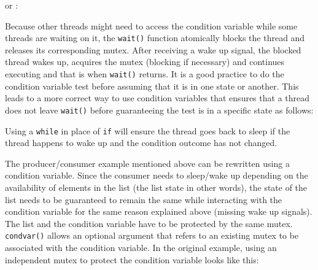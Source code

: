 
or :


Because other threads might need to access the condition variable while
some threads are waiting on it, the \texttt{wait()} function
atomically blocks the thread and releases its corresponding mutex.
After receiving a wake up signal, the blocked thread wakes up, acquires
the mutex (blocking if necessary) and continues executing and that is
when \texttt{wait()} returns. It is a good practice to do
the condition variable test before assuming that it is in one state or
another. This leads to a more correct way to use condition variables
that ensures that a thread does not leave \texttt{wait()}
before guaranteeing the test is in a specific state as follows:


Using a \texttt{while} in place of \texttt{if}
will ensure the thread goes back to sleep if the thread happens to wake
up and the condition outcome has not changed.

The producer/consumer example mentioned above can be rewritten using a
condition variable. Since the consumer needs to sleep/wake up depending
on the availability of elements in the list (the list state in other
words), the state of the list needs to be guaranteed to remain the same
while interacting with the condition variable for the same reason
explained above (missing wake up signals). The list and the condition
variable have to be protected by the same mutex.
\texttt{condvar()} allows an optional argument that refers
to an existing mutex to be associated with the condition variable. In
the original example, using an independent mutex to protect the
condition variable looks like this:

